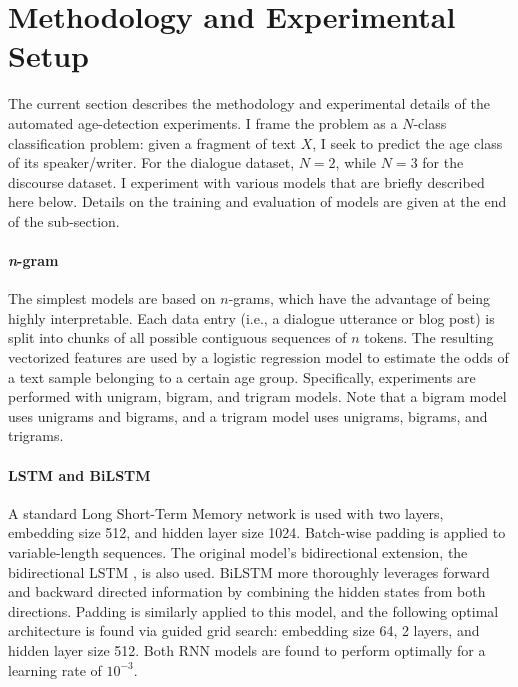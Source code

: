 \section{Methodology and Experimental Setup}
\label{sec:exp1_methods_exp_setup}

The current section describes the methodology and experimental details of the automated age-detection experiments. I frame the problem as a $N$-class classification problem: given a fragment of text $X$, I seek to predict
the age class of its speaker/writer.
For the dialogue dataset, $N=2$, while $N=3$ for the discourse dataset.
I experiment with various models that are briefly described here below. Details on the training and evaluation of models are given at the end of the sub-section.


\paragraph{\textit{n}-gram} 
The simplest models are based on $n$-grams, which have the advantage of being highly interpretable.
Each data entry (i.e., a dialogue utterance or blog post) is split into chunks of all possible contiguous sequences of $n$ tokens. The resulting vectorized features are used by a logistic regression model to estimate the odds of a text sample belonging to a certain age group. Specifically, experiments are performed with unigram, bigram, and trigram models. Note that a bigram model uses unigrams and bigrams, and a trigram model uses unigrams, bigrams, and trigrams.

\paragraph{LSTM and BiLSTM}
A standard Long Short-Term Memory network \cite[LSTM;][]{hochreiter1997long} is used with two layers, embedding size 512, and hidden layer size 1024. Batch-wise padding is applied to variable-length sequences. The original model's bidirectional extension, the bidirectional LSTM \cite[BiLSTM;][]{schuster1997bidirectional}, is also used.
BiLSTM more thoroughly leverages forward and backward directed information by combining the hidden states from both directions. Padding is similarly applied to this model, and the following optimal architecture is found via guided grid search: embedding size 64, 2 layers, and hidden layer size 512. Both RNN models are found to perform optimally for a learning rate of $10^{-3}$.

